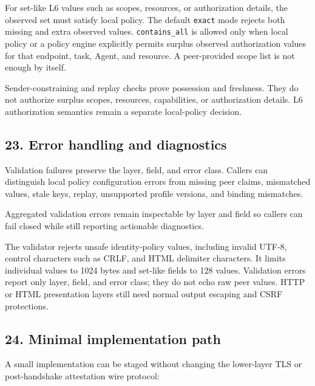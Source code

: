 \documentclass[
]{article}
\begin{document}
For set-like L6 values such as scopes, resources, or authorization
details, the observed set must satisfy local policy. The default
\texttt{exact} mode rejects both missing and extra observed values.
\texttt{contains\_all} is allowed only when local policy or a policy
engine explicitly permits surplus observed authorization values for that
endpoint, task, Agent, and resource. A peer-provided scope list is not
enough by itself.

Sender-constraining and replay checks prove possession and freshness.
They do not authorize surplus scopes, resources, capabilities, or
authorization details. L6 authorization semantics remain a separate
local-policy decision.

\subsection{23. Error handling and
diagnostics}\label{error-handling-and-diagnostics}

Validation failures preserve the layer, field, and error class. Callers
can distinguish local policy configuration errors from missing peer
claims, mismatched values, stale keys, replay, unsupported profile
versions, and binding mismatches.

Aggregated validation errors remain inspectable by layer and field so
callers can fail closed while still reporting actionable diagnostics.

The validator rejects unsafe identity-policy values, including invalid
UTF-8, control characters such as CRLF, and HTML delimiter characters.
It limits individual values to 1024 bytes and set-like fields to 128
values. Validation errors report only layer, field, and error class;
they do not echo raw peer values. HTTP or HTML presentation layers still
need normal output escaping and CSRF protections.

\subsection{24. Minimal implementation
path}\label{minimal-implementation-path}

A small implementation can be staged without changing the lower-layer
TLS or post-handshake attestation wire protocol:
\end{document}
